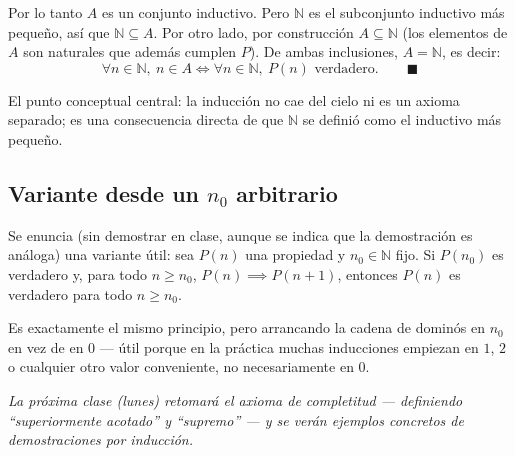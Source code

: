 \documentclass[12pt,a4paper]{article}
\begin{document}
Por lo tanto $A$ es un conjunto inductivo. Pero $\mathbb{N}$ es el
subconjunto inductivo más pequeño, así que $\mathbb{N} \subseteq A$. Por
otro lado, por construcción $A \subseteq \mathbb{N}$ (los elementos de $A$
son naturales que además cumplen $P$). De ambas inclusiones,
$A = \mathbb{N}$, es decir:
$$\forall n \in \mathbb{N},\ n \in A \iff \forall n \in \mathbb{N},\ P(n) \text{ verdadero.} \qquad \blacksquare$$

\begin{notebox}[No es magia]
El punto conceptual central: la inducción no cae del cielo ni es un axioma
separado; es una consecuencia directa de que $\mathbb{N}$ se definió como
el inductivo más pequeño.
\end{notebox}

\subsection{Variante desde un $n_0$ arbitrario}

Se enuncia (sin demostrar en clase, aunque se indica que la demostración es
análoga) una variante útil: sea $P(n)$ una propiedad y $n_0 \in \mathbb{N}$
fijo. Si $P(n_0)$ es verdadero y, para todo $n \geq n_0$,
$P(n) \implies P(n+1)$, entonces $P(n)$ es verdadero para todo $n \geq
n_0$.

\begin{notebox}
Es exactamente el mismo principio, pero arrancando la cadena de dominós en
$n_0$ en vez de en $0$ --- útil porque en la práctica muchas inducciones
empiezan en $1$, $2$ o cualquier otro valor conveniente, no necesariamente
en $0$.
\end{notebox}

\bigskip
\noindent\emph{La próxima clase (lunes) retomará el axioma de completitud
--- definiendo ``superiormente acotado'' y ``supremo'' --- y se verán
ejemplos concretos de demostraciones por inducción.}
\end{document}
